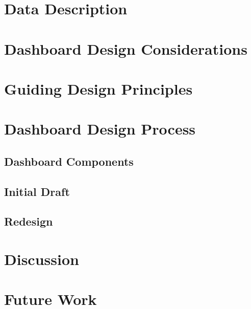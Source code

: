 \documentclass[print]{nuthesis}
\begin{document}
\hypertarget{data-description}{%
\section{Data Description}\label{data-description}}

\hypertarget{dashboard-design-considerations}{%
\section{Dashboard Design Considerations}\label{dashboard-design-considerations}}

\hypertarget{guiding-design-principles}{%
\section{Guiding Design Principles}\label{guiding-design-principles}}

\hypertarget{dashboard-design-process}{%
\section{Dashboard Design Process}\label{dashboard-design-process}}

\hypertarget{dashboard-components}{%
\subsection{Dashboard Components}\label{dashboard-components}}

\hypertarget{initial-draft}{%
\subsection{Initial Draft}\label{initial-draft}}

\hypertarget{redesign}{%
\subsection{Redesign}\label{redesign}}

\hypertarget{discussion}{%
\section{Discussion}\label{discussion}}

\hypertarget{future-work}{%
\section{Future Work}\label{future-work}}
\end{document}
